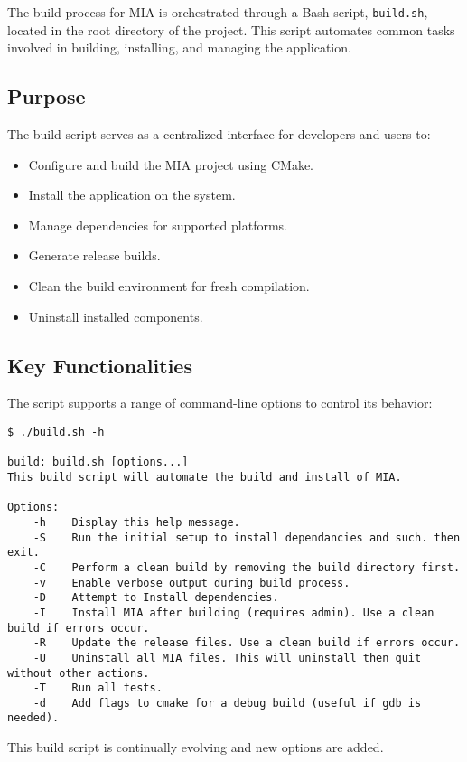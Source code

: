 The build process for MIA is orchestrated through a Bash script, \texttt{build.sh}, located in the root directory of the project. This script automates common tasks involved in building, installing, and managing the application.

\subsection{Purpose}

The build script serves as a centralized interface for developers and users to:
\begin{itemize}\itemsep0em
	\item Configure and build the MIA project using CMake.
	\item Install the application on the system.
	\item Manage dependencies for supported platforms.
	\item Generate release builds.
	\item Clean the build environment for fresh compilation.
	\item Uninstall installed components.
\end{itemize}

\subsection{Key Functionalities}

The script supports a range of command-line options to control its behavior:
\begin{lstlisting}[style=terminalstyle]
$ ./build.sh -h

build: build.sh [options...]
This build script will automate the build and install of MIA.

Options:
    -h    Display this help message.
	-S    Run the initial setup to install dependancies and such. then exit.
	-C    Perform a clean build by removing the build directory first.
	-v    Enable verbose output during build process.
	-D    Attempt to Install dependencies.
	-I    Install MIA after building (requires admin). Use a clean build if errors occur.
	-R    Update the release files. Use a clean build if errors occur.
	-U    Uninstall all MIA files. This will uninstall then quit without other actions.
	-T    Run all tests.
	-d    Add flags to cmake for a debug build (useful if gdb is needed).
\end{lstlisting}
This build script is continually evolving and new options are added.

